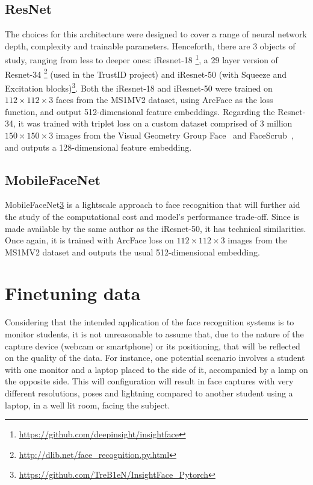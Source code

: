 \documentclass[class=report, crop=false, a4paper, 12pt]{standalone}
\begin{document}
\subsection{ResNet}
The choices for this architecture were designed to cover a range of neural network depth, complexity and trainable parameters. Henceforth, there are 3 objects of study, ranging from less to deeper ones: iResnet-18 \footnote{\url{https://github.com/deepinsight/insightface}}, a 29 layer version of Resnet-34 \footnote{\url{http://dlib.net/face_recognition.py.html}} (used in the TrustID project) and iResnet-50 (with Squeeze and Excitation blocks)\footnote{\label{fnote6}\url{https://github.com/TreB1eN/InsightFace_Pytorch}}. Both the iResnet-18 and iResnet-50 were trained on $112\times112\times3$ faces from the MS1MV2 dataset, using ArcFace as the loss function, and output 512-dimensional feature embeddings. Regarding the Resnet-34, it was trained with triplet loss on a custom dataset comprised of 3 million $150\times150\times3$ images from the Visual Geometry Group
Face~\autocite{parkhiDeepFaceRecognition2015} and FaceScrub~\autocite{ngDatadrivenApproachCleaning2014}, and outputs a 128-dimensional feature embedding.

\subsection{MobileFaceNet}
MobileFaceNet\cref{fnote6} is a lightscale approach to face recognition that will further aid the study of the computational cost and model's performance trade-off. Since is made available by the same author as the iResnet-50, it has technical similarities. Once again, it is trained with ArcFace loss on $112\times112\times3$ images from the MS1MV2 dataset and outputs the usual 512-dimensional embedding.


\section{Finetuning data}
Considering that the intended application of the face recognition systems is to monitor students, it is not unreasonable to assume that, due to the nature of the capture device (webcam or smartphone) or its positioning, that will be reflected on the quality of the data. For instance, one potential scenario involves a student with one monitor and a laptop placed to the side of it, accompanied by a lamp on the opposite side. This will configuration will result in face captures with very different resolutions, poses and lightning compared to another student using a laptop, in a well lit room, facing the subject. 
\end{document}
